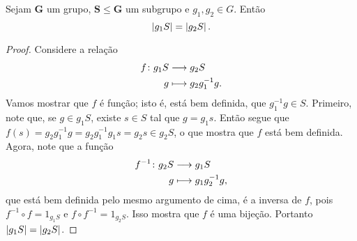 \begin{proposition}
Sejam $\bm G$ um grupo, $\bm S \leq \bm G$ um subgrupo e $g_1,g_2 \in G$. Então
	\begin{equation*}
	\left\lvert{g_1S}\right\rvert=\left\lvert{g_2S}\right\rvert.
	\end{equation*}
\end{proposition}
\begin{proof}
Considere a relação
	\begin{align*}
	{f}\colon {g_1S} &\longrightarrow {g_2S} \\{g} &\longmapsto g_2g_1^{-1} g.
	\end{align*}
Vamos mostrar que $f$ é função; isto é, está bem definida, que $g_1^{-1}g \in S$. Primeiro, note que, se $g \in g_1S$, existe $s\in S$ tal que $g=g_1s$. Então segue que $f(s)=g_2g_1^{-1}g=g_2g_1^{-1}g_1s=g_2s \in g_2S$, o que mostra que $f$ está bem definida. Agora, note que a função
	\begin{align*}
	{f^{-1}}\colon {g_2S} &\longrightarrow {g_1S} \\{g} &\longmapsto g_1g_2^{-1} g,
	\end{align*}
que está bem definida pelo mesmo argumento de cima, é a inversa de $f$, pois $f^{-1} \circ f=1_{g_1S}$ e $f \circ f^{-1}=1_{g_2S}$. Isso mostra que $f$ é uma bijeção. Portanto $\left\lvert{g_1S}\right\rvert=\left\lvert{g_2S}\right\rvert$.

\end{proof}

